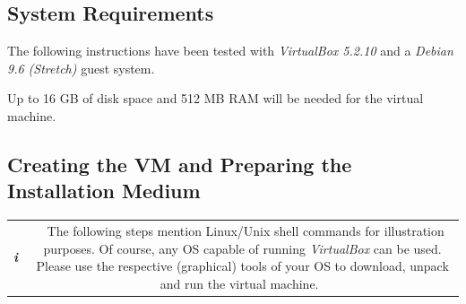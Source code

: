 \documentclass[12pt,english,parskip=half]{scrreprt}
\newcommand{\infobox}[1]{
  \hfill
  \setlength\arrayrulewidth{1pt}
  \begin{tabular}[t]{c|c|}
    \parbox{1.8em}{\hfill\textit{\Huge\textbf{i}\,}}
    &
    \,\parbox{0.89\linewidth}{\setlength{\parskip}{0.5em}#1}\,
  \end{tabular}
  \par
}
\begin{document}
\subsection{System Requirements}
\label{sec:tutorial-vm-requirements}


The following instructions have been tested with \textit{VirtualBox 5.2.10} and a
\textit{Debian 9.6 (Stretch)} guest system.

Up to 16 GB of disk space and 512 MB RAM will be needed for the virtual machine.



\subsection{Creating the VM and Preparing the Installation Medium}
\label{sec:tutorial-vm-create}


\infobox{
  The following steps mention Linux/Unix shell commands for illustration purposes.
  Of course, any OS capable of running \textit{VirtualBox} can be used.
  Please use the respective (graphical) tools of your OS to download, unpack and
  run the virtual machine.
}
\end{document}
